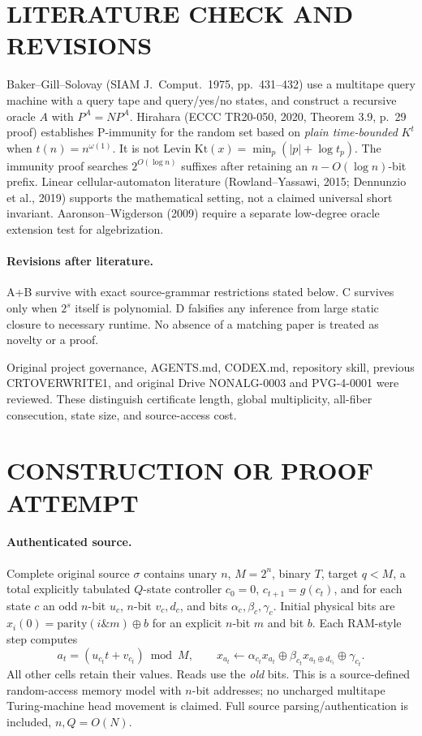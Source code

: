 \documentclass[11pt]{article}
\begin{document}
\section{LITERATURE CHECK AND REVISIONS}
Baker--Gill--Solovay (SIAM J.\ Comput.\ 1975, pp.\ 431--432)
use a multitape query machine with a query tape and query/yes/no states,
and construct a recursive oracle $A$ with $P^A=NP^A$.
Hirahara (ECCC TR20-050, 2020, Theorem 3.9, p.\ 29 proof) establishes
P-immunity for the random set based on \emph{plain time-bounded} $K^t$
when $t(n)=n^{\omega(1)}$. It is not Levin
$\mathrm{Kt}(x)=\min_p(|p|+\log t_p)$.
The immunity proof searches $2^{O(\log n)}$ suffixes after retaining
an $n-O(\log n)$-bit prefix. Linear cellular-automaton literature
(Rowland--Yassawi, 2015; Dennunzio et al., 2019) supports the
mathematical setting, not a claimed universal short invariant.
Aaronson--Wigderson (2009) require a separate low-degree oracle
extension test for algebrization.

\paragraph{Revisions after literature.} A+B survive with exact source-grammar
restrictions stated below. C survives only when $2^s$ itself is polynomial.
D falsifies any inference from large static closure to necessary runtime.
No absence of a matching paper is treated as novelty or a proof.

Original project governance, AGENTS.md, CODEX.md, repository skill,
previous CRTOVERWRITE1, and original Drive NONALG-0003 and PVG-4-0001
were reviewed. These distinguish certificate length, global
multiplicity, all-fiber consecution, state size, and source-access cost.

\section{CONSTRUCTION OR PROOF ATTEMPT}
\paragraph{Authenticated source.} Complete original source $\sigma$ contains
unary $n$, $M=2^n$, binary $T$, target $q<M$,
a total explicitly tabulated $Q$-state controller
$c_0=0$, $c_{t+1}=g(c_t)$, and for each state $c$ an odd
$n$-bit $u_c$, $n$-bit $v_c,d_c$, and bits
$\alpha_c,\beta_c,\gamma_c$. Initial physical bits are
$x_i(0)=\mathrm{parity}(i\mathbin{\&}m)\oplus b$
for an explicit $n$-bit $m$ and bit $b$. Each RAM-style step computes
\[
a_t=(u_{c_t}t+v_{c_t})\bmod M,\qquad
x_{a_t}\leftarrow
\alpha_{c_t}x_{a_t}\oplus
\beta_{c_t}x_{a_t\oplus d_{c_t}}\oplus\gamma_{c_t}.
\]
All other cells retain their values. Reads use the \emph{old} bits.
This is a source-defined random-access memory model with $n$-bit
addresses; no uncharged multitape Turing-machine head movement is
claimed. Full source parsing/authentication is included, $n,Q=O(N)$.
\end{document}
